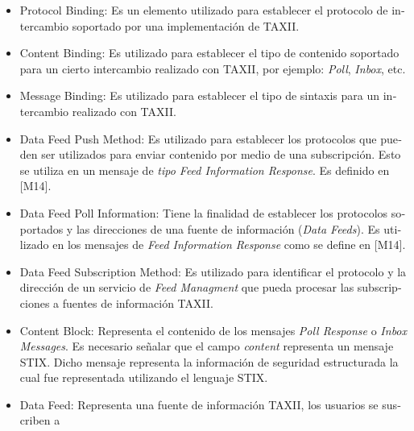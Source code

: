 \documentclass[11pt]{article}
\begin{document}
\liststyleWWNumii
\begin{itemize}
\item \foreignlanguage{spanish}{Protocol Binding: Es un elemento utilizado para establecer el protocolo de intercambio
soportado por una implementación de TAXII.}
\item \foreignlanguage{spanish}{Content Binding: Es utilizado para establecer el tipo de contenido soportado para un
cierto intercambio realizado con TAXII, por ejemplo:
}\foreignlanguage{spanish}{\textit{Poll}}\foreignlanguage{spanish}{,
}\foreignlanguage{spanish}{\textit{Inbox}}\foreignlanguage{spanish}{, etc.}
\item \foreignlanguage{spanish}{Message Binding: Es utilizado para establecer el tipo de sintaxis para un intercambio
realizado con TAXII.}
\item \foreignlanguage{spanish}{Data Feed Push Method: Es utilizado para establecer los protocolos que pueden ser
utilizados para enviar contenido por medio de una subscripción. Esto se utiliza en un mensaje de
}\foreignlanguage{spanish}{\textit{tipo Feed Information Response}}\foreignlanguage{spanish}{. Es definido en [M14].}
\item \foreignlanguage{spanish}{Data Feed Poll Information: Tiene la finalidad de establecer los protocolos soportados y
las direcciones de una fuente de información (}\foreignlanguage{spanish}{\textit{Data
Feeds}}\foreignlanguage{spanish}{). Es utilizado en los mensajes de }\foreignlanguage{spanish}{\textit{Feed Information
Response}}\foreignlanguage{spanish}{ como se define en [M14].}
\item \foreignlanguage{spanish}{Data Feed Subscription Method: Es utilizado para identificar el protocolo y la dirección
de un servicio de }\foreignlanguage{spanish}{\textit{Feed Managment}}\foreignlanguage{spanish}{ que pueda procesar las
subscripciones a fuentes de información TAXII.}
\item \foreignlanguage{spanish}{Content Block: Representa el contenido de los mensajes
}\foreignlanguage{spanish}{\textit{Poll Response }}\foreignlanguage{spanish}{o }\foreignlanguage{spanish}{\textit{Inbox
Messages}}\foreignlanguage{spanish}{. Es necesario señalar que el campo
}\foreignlanguage{spanish}{\textit{content}}\foreignlanguage{spanish}{ representa un mensaje STIX. Dicho mensaje
representa la información de seguridad estructurada la cual fue representada utilizando el lenguaje STIX.}
\item \foreignlanguage{spanish}{Data Feed: Representa una fuente de información TAXII, los usuarios se suscriben a
}
\end{itemize}
\end{document}
